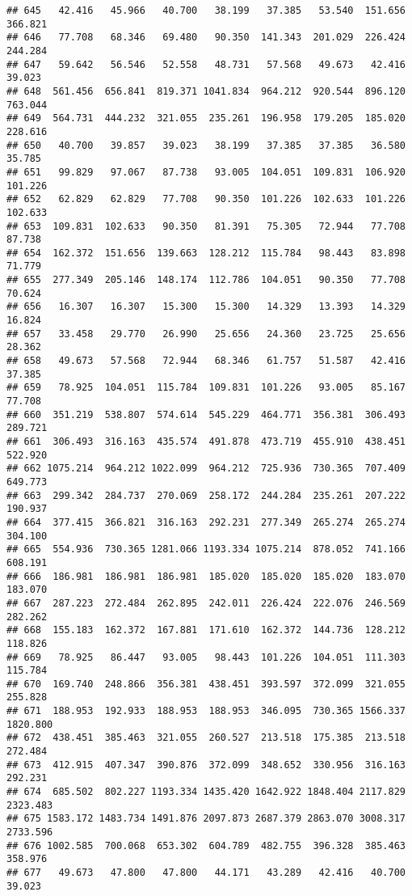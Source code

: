 \documentclass[
]{article}
\begin{document}
\begin{verbatim}
## 645   42.416   45.966   40.700   38.199   37.385   53.540  151.656  366.821
## 646   77.708   68.346   69.480   90.350  141.343  201.029  226.424  244.284
## 647   59.642   56.546   52.558   48.731   57.568   49.673   42.416   39.023
## 648  561.456  656.841  819.371 1041.834  964.212  920.544  896.120  763.044
## 649  564.731  444.232  321.055  235.261  196.958  179.205  185.020  228.616
## 650   40.700   39.857   39.023   38.199   37.385   37.385   36.580   35.785
## 651   99.829   97.067   87.738   93.005  104.051  109.831  106.920  101.226
## 652   62.829   62.829   77.708   90.350  101.226  102.633  101.226  102.633
## 653  109.831  102.633   90.350   81.391   75.305   72.944   77.708   87.738
## 654  162.372  151.656  139.663  128.212  115.784   98.443   83.898   71.779
## 655  277.349  205.146  148.174  112.786  104.051   90.350   77.708   70.624
## 656   16.307   16.307   15.300   15.300   14.329   13.393   14.329   16.824
## 657   33.458   29.770   26.990   25.656   24.360   23.725   25.656   28.362
## 658   49.673   57.568   72.944   68.346   61.757   51.587   42.416   37.385
## 659   78.925  104.051  115.784  109.831  101.226   93.005   85.167   77.708
## 660  351.219  538.807  574.614  545.229  464.771  356.381  306.493  289.721
## 661  306.493  316.163  435.574  491.878  473.719  455.910  438.451  522.920
## 662 1075.214  964.212 1022.099  964.212  725.936  730.365  707.409  649.773
## 663  299.342  284.737  270.069  258.172  244.284  235.261  207.222  190.937
## 664  377.415  366.821  316.163  292.231  277.349  265.274  265.274  304.100
## 665  554.936  730.365 1281.066 1193.334 1075.214  878.052  741.166  608.191
## 666  186.981  186.981  186.981  185.020  185.020  185.020  183.070  183.070
## 667  287.223  272.484  262.895  242.011  226.424  222.076  246.569  282.262
## 668  155.183  162.372  167.881  171.610  162.372  144.736  128.212  118.826
## 669   78.925   86.447   93.005   98.443  101.226  104.051  111.303  115.784
## 670  169.740  248.866  356.381  438.451  393.597  372.099  321.055  255.828
## 671  188.953  192.933  188.953  188.953  346.095  730.365 1566.337 1820.800
## 672  438.451  385.463  321.055  260.527  213.518  175.385  213.518  272.484
## 673  412.915  407.347  390.876  372.099  348.652  330.956  316.163  292.231
## 674  685.502  802.227 1193.334 1435.420 1642.922 1848.404 2117.829 2323.483
## 675 1583.172 1483.734 1491.876 2097.873 2687.379 2863.070 3008.317 2733.596
## 676 1002.585  700.068  653.302  604.789  482.755  396.328  385.463  358.976
## 677   49.673   47.800   47.800   44.171   43.289   42.416   40.700   39.023

\end{verbatim}
\end{document}
